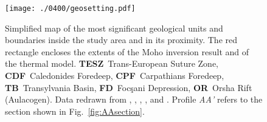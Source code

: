 \begin{figure}
    \begin{adjustbox}{center}
        \texttt{[image: ./0400/geosetting.pdf]}
    \end{adjustbox}
	\caption[Simplified map of the most significant geological units and boundaries inside the study area and in its proximity.]{Simplified map of the most significant geological units and boundaries inside the study area and in its proximity. The red rectangle encloses the extents of the Moho inversion result and of the thermal model. \textbf{TESZ}~Trans-European Suture Zone, \textbf{CDF}~Caledonides Foredeep, \textbf{CPF}~Carpathians Foredeep, \textbf{TB}~Transylvania Basin, \textbf{FD}~Focşani Depression, \textbf{OR}~Orsha Rift (Aulacogen). Data redrawn from \textcite{Tarapoanca2003}, \textcite{Tesauro2008}, \textcite{Artemieva2013}, \textcite{Mazur2016}, and \textcite{Starostenko2018}. Profile \textit{AA'} refers to the section shown in Fig.~\ref{fig:AAsection}.}
    \label{fig:geosetting}
\end{figure}

